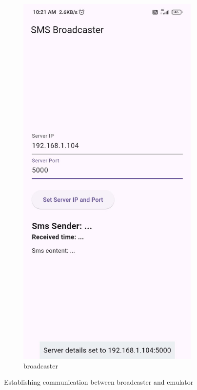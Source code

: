 \documentclass[a4paper,12pt]{article}
\begin{document}
\begin{figure}[h]
\begin{subfigure}[b]{0.2\textwidth}
        \includegraphics[width=\textwidth]{../images/setting-server-details.jpeg}
        \caption{broadcaster}
    \end{subfigure}
    \caption{Establishing communication between broadcaster and emulator}
\end{figure}
\end{document}

